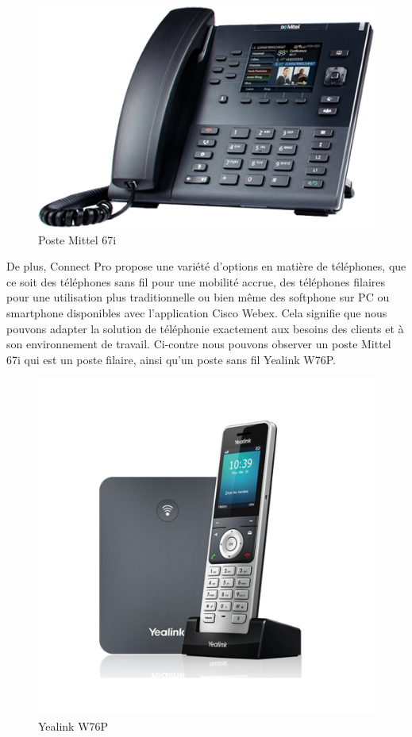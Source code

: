 \documentclass[12pt, a4paper]{article}
\begin{document}
\newpage
\begingroup
\setlength{\intextsep}{0pt}
\begin{figure}
	\includegraphics[scale=.5]{img/mittel.jpg}
	\caption{Poste Mittel 67i \cite{r1}}
\end{figure}
De plus, Connect Pro propose une variété
d'options en matière de téléphones, que
ce soit des téléphones sans fil pour
une mobilité accrue, des téléphones
filaires pour une utilisation plus
traditionnelle ou bien même des softphone 
sur PC ou smartphone disponibles avec 
l'application Cisco Webex. Cela signifie que nous pouvons
adapter la solution de téléphonie exactement aux besoins
des clients et à son environnement de travail.
Ci-contre nous pouvons observer un poste Mittel 67i
qui est un poste filaire, ainsi qu'un poste sans fil
Yealink W76P.\\
\begin{figure}
	\includegraphics[scale=.6]{img/yealink.png}
	\caption{Yealink W76P \cite{r2}}
\end{figure}
\end{document}
